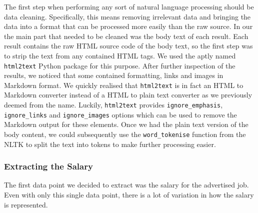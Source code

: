 \documentclass[runningheads]{llncs}
\begin{document}
The first step when performing any sort of natural language processing should be data cleaning. Specifically, this means removing irrelevant data and bringing the data into a format that can be processed more easily than the raw source. In our the main part that needed to be cleaned was the body text of each result. Each result contains the raw HTML source code of the body text, so the first step was to strip the text from any contained HTML tags. We used the aptly named \texttt{html2text} Python package for this purpose. After further inspection of the results, we noticed that some contained formatting, links and images in Markdown format. We quickly realised that \texttt{html2text} is in fact an HTML to Markdown converter instead of a HTML to plain text converter as we previously deemed from the name. Luckily, \texttt{html2text} provides \texttt{ignore\_emphasis}, \texttt{ignore\_links} and \texttt{ignore\_images} options which can be used to remove the Markdown output for these elements. Once we had the plain text version of the body content, we could subsequently use the \texttt{word\_tokenise} function from the NLTK to split the text into tokens to make further processing easier.

\subsubsection{Extracting the Salary}
\label{subsub:extracting_the_salary}

The first data point we decided to extract was the salary for the advertised job. Even with only this single data point, there is a lot of variation in how the salary is represented.
\end{document}
